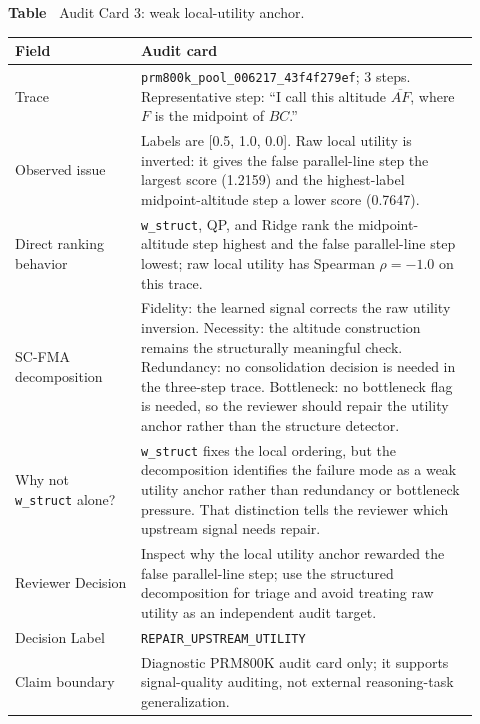 \documentclass[a4paper,fleqn]{cas-sc}
\makeatletter
\providecommand{\DIFaddtex}[1]{{\protect\color{blue}\uwave{#1}}} %
\providecommand{\DIFdeltex}[1]{{\protect\color{red}\sout{#1}}} %
\providecommand{\DIFaddbegin}{} %
\providecommand{\DIFaddend}{} %
\providecommand{\DIFdelbegin}{} %
\providecommand{\DIFdelend}{} %
\providecommand{\DIFadd}[1]{\texorpdfstring{\DIFaddtex{#1}}{#1}} %
\providecommand{\DIFdel}[1]{\texorpdfstring{\DIFdeltex{#1}}{}} %
\providecommand{\DIFscaledelfig}{0.5}
\newlength{\DIFdelgraphicswidth} %
\newlength{\DIFdelgraphicsheight} %
\providecommand{\DIFaddincludegraphics}[2][]{{\color{blue}\fbox{\DIFOincludegraphics[#1]{#2}}}} %
\providecommand{\DIFdelincludegraphics}[2][]{%
\sbox{\DIFdelgraphicsbox}{\DIFOincludegraphics[#1]{#2}}%
\settoboxwidth{\DIFdelgraphicswidth}{\DIFdelgraphicsbox} %
\settoboxtotalheight{\DIFdelgraphicsheight}{\DIFdelgraphicsbox} %
\scalebox{\DIFscaledelfig}{%
\parbox[b]{\DIFdelgraphicswidth}{\usebox{\DIFdelgraphicsbox}\\[-\baselineskip] \rule{\DIFdelgraphicswidth}{0em}}\llap{\resizebox{\DIFdelgraphicswidth}{\DIFdelgraphicsheight}{%
\setlength{\unitlength}{\DIFdelgraphicswidth}%
\begin{picture}(1,1)%
\thicklines\linethickness{2pt} %
{\color[rgb]{1,0,0}\put(0,0){\framebox(1,1){}}}%
{\color[rgb]{1,0,0}\put(0,0){\line( 1,1){1}}}%
{\color[rgb]{1,0,0}\put(0,1){\line(1,-1){1}}}%
\end{picture}%
}\hspace*{3pt}}} %
} %
\DeclareRobustCommand{\DIFaddbegin}{\DIFOaddbegin \let\includegraphics\DIFaddincludegraphics} %
\DeclareRobustCommand{\DIFaddend}{\DIFOaddend \let\includegraphics\DIFOincludegraphics} %
\DeclareRobustCommand{\DIFdelbegin}{\DIFOdelbegin \let\includegraphics\DIFdelincludegraphics} %
\DeclareRobustCommand{\DIFdelend}{\DIFOaddend \let\includegraphics\DIFOincludegraphics} %
\let\sout@orig\sout %
\renewcommand{\sout}[1]{\ifmmode\text{\sout@orig{\ensuremath{#1}}}\else\sout@orig{#1}\fi} %
\makeatother
\begin{document}
\par\medskip
{}\label{tab:audit-card-utility}
\noindent\textbf{Table~\thetable\DIFaddbegin \DIFadd{:}\DIFaddend } \DIFdelbegin %
\DIFdelend Audit Card 3: weak local-utility anchor.
\begin{center}
\small
\renewcommand{\arraystretch}{1.08}
\begin{tabular}{p{0.25\linewidth}p{0.67\linewidth}}
\toprule
\textbf{Field} & \textbf{Audit card} \\
\midrule
Trace & \texttt{prm800k\_pool\_006217\_43f4f279ef}; 3 steps. Representative step: ``I call this altitude $\overline{AF}$, where $F$ is the midpoint of $BC$.'' \\
Observed issue & Labels are [0.5, 1.0, 0.0]. Raw local utility is inverted: it gives the false parallel-line step the largest score (1.2159) and the highest-label midpoint-altitude step a lower score (0.7647). \\
Direct ranking behavior & \texttt{w\_struct}, QP, and Ridge rank the midpoint-altitude step highest and the false parallel-line step lowest; raw local utility has Spearman \DIFdelbegin \DIFdel{$\rho=-1.0$ }\DIFdelend \DIFaddbegin \DIFadd{$\rho = -1.0$ }\DIFaddend on this trace. \\
SC-FMA decomposition & Fidelity: the learned signal corrects the raw utility inversion. Necessity: the altitude construction remains the structurally meaningful check. Redundancy: no consolidation decision is needed in the three-step trace. Bottleneck: no bottleneck flag is needed, so the reviewer should repair the utility anchor rather than the structure detector. \\
Why not \texttt{w\_struct} alone? & \texttt{w\_struct} fixes the local ordering, but the decomposition identifies the failure mode as a weak utility anchor rather than redundancy or bottleneck pressure. That distinction tells the reviewer which upstream signal needs repair. \\
Reviewer Decision & Inspect why the local utility anchor rewarded the false parallel-line step; use the structured decomposition for triage and avoid treating raw utility as an independent audit target. \\
Decision Label & \texttt{REPAIR\_UPSTREAM\_UTILITY} \\
Claim boundary & Diagnostic PRM800K audit card only; it supports signal-quality auditing, not external reasoning-task generalization. \\
\bottomrule
\end{tabular}
\end{center}
\medskip
\end{document}

